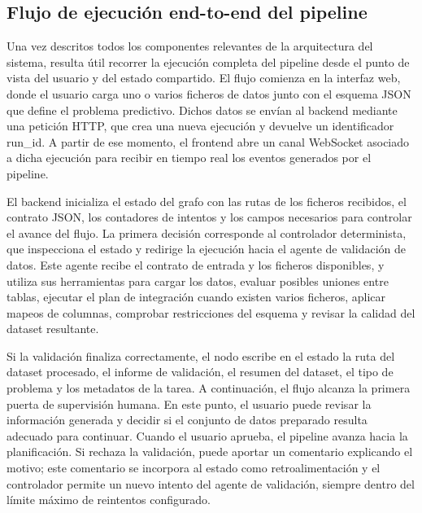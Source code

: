 \documentclass[12pt,a4paper]{article}
\theoremstyle{plain}
\begin{document}
\subsection{Flujo de ejecución end-to-end del pipeline}
\label{sec:flujo-end-to-end}

Una vez descritos todos los componentes relevantes de la arquitectura del sistema, resulta útil recorrer la ejecución completa del pipeline desde el punto de vista del usuario y del estado compartido. El flujo comienza en la interfaz web, donde el usuario carga uno o varios ficheros de datos junto con el esquema JSON que define el problema predictivo. Dichos datos se envían al backend mediante una petición HTTP, que crea una nueva ejecución y devuelve un identificador run\_id. A partir de ese momento, el frontend abre un canal WebSocket asociado a dicha ejecución para recibir en tiempo real los eventos generados por el pipeline.

El backend inicializa el estado del grafo con las rutas de los ficheros recibidos, el contrato JSON, los contadores de intentos y los campos necesarios para controlar el avance del flujo. La primera decisión corresponde al controlador determinista, que inspecciona el estado y redirige la ejecución hacia el agente de validación de datos. Este agente recibe el contrato de entrada y los ficheros disponibles, y utiliza sus herramientas para cargar los datos, evaluar posibles uniones entre tablas, ejecutar el plan de integración cuando existen varios ficheros, aplicar mapeos de columnas, comprobar restricciones del esquema y revisar la calidad del dataset resultante.

Si la validación finaliza correctamente, el nodo escribe en el estado la ruta del dataset procesado, el informe de validación, el resumen del dataset, el tipo de problema y los metadatos de la tarea. A continuación, el flujo alcanza la primera puerta de supervisión humana. En este punto, el usuario puede revisar la información generada y decidir si el conjunto de datos preparado resulta adecuado para continuar. Cuando el usuario aprueba, el pipeline avanza hacia la planificación. Si rechaza la validación, puede aportar un comentario explicando el motivo; este comentario se incorpora al estado como retroalimentación y el controlador permite un nuevo intento del agente de validación, siempre dentro del límite máximo de reintentos configurado. %
\end{document}

